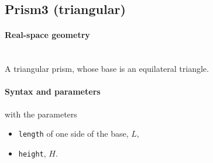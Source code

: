 \clearpage
\subsection{Prism3 (triangular)} \label{sec:Prism3}

\paragraph{Real-space geometry}\strut\\
A triangular prism, whose base is an equilateral
triangle.

\begin{figure}[h]
\hfill
{}
\hfill
{}
\hfill
\end{figure}

\FloatBarrier

\paragraph{Syntax and parameters}
\begin{quote}
\end{quote}
with the parameters
\begin{itemize}
\item \texttt{length} of one side of the base, $L$,
\item \texttt{height}, $H$.
\end{itemize}


